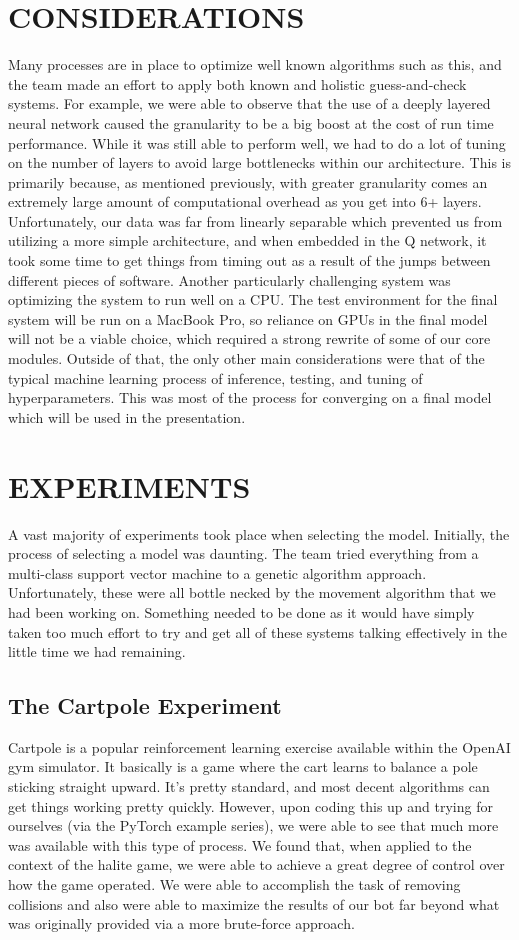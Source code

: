 \documentclass[letterpaper, 11 pt, conference]{ieeeconf}
\begin{document}
\section{CONSIDERATIONS}
Many processes are in place to optimize well known algorithms such as this, and the team made an effort to apply both known and holistic guess-and-check systems. For example, we were able to observe that the use of a deeply layered neural network caused the granularity to be a big boost at the cost of run time performance. While it was still able to perform well, we had to do a lot of tuning on the number of layers to avoid large bottlenecks within our architecture. This is primarily because, as mentioned previously, with greater granularity comes an extremely large amount of computational overhead as you get into 6+ layers. Unfortunately, our data was far from linearly separable which prevented us from utilizing a more simple architecture, and when embedded in the Q network, it took some time to get things from timing out as a result of the jumps between different pieces of software. Another particularly challenging system was optimizing the system to run well on a CPU. The test environment for the final system will be run on a MacBook Pro, so reliance on GPUs in the final model will not be a viable choice, which required a strong rewrite of some of our core modules. Outside of that, the only other main considerations were that of the typical machine learning process of inference, testing, and tuning of hyperparameters. This was most of the process for converging on a final model which will be used in the presentation.

\section{EXPERIMENTS}
A vast majority of experiments took place when selecting the model. Initially, the process of selecting a model was daunting. The team tried everything from a multi-class support vector machine to a genetic algorithm approach. Unfortunately, these were all bottle necked by the movement algorithm that we had been working on. Something needed to be done as it would have simply taken too much effort to try and get all of these systems talking effectively in the little time we had remaining.
\subsection{The Cartpole Experiment}
Cartpole is a popular reinforcement learning exercise available within the OpenAI gym simulator. It basically is a game where the cart learns to balance a pole sticking straight upward. It's pretty standard, and most decent algorithms can get things working pretty quickly. However, upon coding this up and trying for ourselves (via the PyTorch example series), we were able to see that much more was available with this type of process. We found that, when applied to the context of the halite game, we were able to achieve a great degree of control over how the game operated. We were able to accomplish the task of removing collisions and also were able to maximize the results of our bot far beyond what was originally provided via a more brute-force approach.
\end{document}
